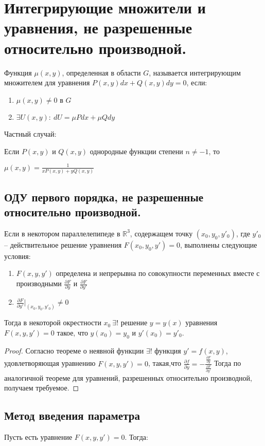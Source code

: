 \documentclass[document.tex]{subfiles}
\begin{document}
\section{Интегрирующие множители и уравнения, не разрешенные относительно производной.}
\begin{definition}
Функция $\mu(x,y)$, определенная в области $G$, называется интегрирующим множителем для уравнения $P(x,y)dx+Q(x,y)dy=0$, если:
\begin{enumerate}
\item $\mu(x,y)\neq0$ в $G$
\item $ \exists U(x,y): \ dU=\mu Pdx+\mu Qdy$
\end{enumerate}
\end{definition}
Частный случай:

Если $P(x,y)$ и $Q(x,y)$ однородные функции степени $n\neq -1$, то 

$\mu(x,y)=\frac{1}{xP(x,y)+yQ(x,y)}$
\subsection{ОДУ первого порядка, не разрешенные относительно производной.}
\begin{theorem}
Если в некотором параллелепипеде в $\mathbb{R}^3$, содержащем точку $(x_0,y_0,y'_0)$, где $y'_0$ -- действительное решение уравнения $F(x_0,y_0,y')=0$, выполнены  следующие условия:
\begin{enumerate}
\item $F(x,y,y')$ определена и непрерывна по совокупности переменных  вместе с производными $\frac{\partial F}{\partial y}$ и $\frac{\partial F}{\partial y'}$
\item $\frac{\partial F}{\partial y'}|_{(x_0,y_0,y'_0)} \neq0$
\end{enumerate}
Тогда в некоторой окрестности $x_0\ \exists!$ решение $y=y(x)$ уравнения $F(x,y,y')=0$ такое, что $y(x_0)=y_0$ и $y'(x_0)=y'_0$.
\end{theorem}
\begin{proof}

Согласно теореме о неявной функции $\exists!$ 
функция $y'=f(x,y)$, удовлетворяющая уравнению $F(x,y,y')=0$, такая,что 
$\frac{\partial f}{\partial y} = - \frac{\frac{\partial F}{\partial y}}{\frac{\partial F}{\partial y'}}$
Тогда по аналогичной теореме для уравнений, разрешенных относительно производной, получаем требуемое.
\end{proof}
\subsection{Метод введения параметра}
Пусть есть уравнение $F(x,y,y')=0$. Тогда:
\end{document}
